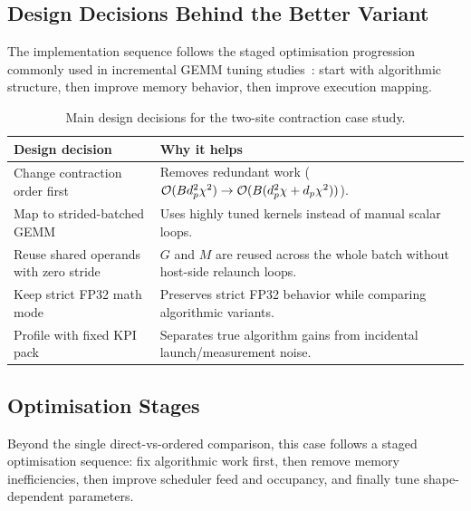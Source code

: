 \subsection{Design Decisions Behind the Better Variant}

The implementation sequence follows the staged optimisation progression commonly
used in incremental GEMM tuning studies~\cite{boehm2022cuda-mmm}:
start with algorithmic structure, then improve memory behavior, then improve
execution mapping.

\begin{table}[H]
  \centering
  \small
  \begin{tabularx}{\textwidth}{l X}
    \toprule
    Design decision & Why it helps \\
    \midrule
    Change contraction order first & Removes redundant work
    ($\mathcal{O}(Bd_p^2\chi^2)\rightarrow\mathcal{O}(B(d_p^2\chi+d_p\chi^2))$). \\
    Map to strided-batched GEMM & Uses highly tuned kernels instead of manual
    scalar loops. \\
    Reuse shared operands with zero stride & $G$ and $M$ are reused across the
    whole batch without host-side relaunch loops. \\
    Keep strict FP32 math mode & Preserves strict FP32 behavior while
    comparing algorithmic variants. \\
    Profile with fixed KPI pack & Separates true algorithm gains from incidental
    launch/measurement noise. \\
    \bottomrule
  \end{tabularx}
  \caption{Main design decisions for the two-site contraction case study.}
  \label{tab:tn-case-design-decisions}
\end{table}

\subsection{Optimisation Stages}

Beyond the single direct-vs-ordered comparison, this case follows a staged
optimisation sequence: fix algorithmic work first, then remove memory
inefficiencies, then improve scheduler feed and occupancy, and finally tune
shape-dependent parameters.

